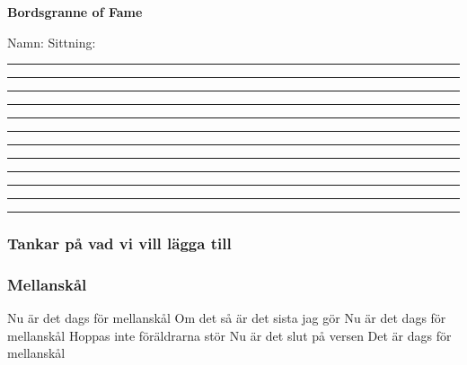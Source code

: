 \noBackground

\newpage
\resetBackground

\thispagestyle{plainnohead}

\vspace*{-13mm} %
\enlargethispage{15mm} %

\begin{center}
    \normalfont\normalsize\bfseries Bordsgranne of Fame
\end{center}

Namn: \hspace{2.5cm} Sittning: 

\vspace*{0.3cm}
\rule{\textwidth}{0.0mm}
\vspace*{0.65cm}
\rule{\textwidth}{0.4mm}
\vspace*{0.65cm}
\rule{\textwidth}{0.4mm}
\vspace*{0.65cm}
\rule{\textwidth}{0.4mm}
\vspace*{0.65cm}
\rule{\textwidth}{0.4mm}
\vspace*{0.65cm}
\rule{\textwidth}{0.4mm}
\vspace*{0.65cm}
\rule{\textwidth}{0.4mm}
\vspace*{0.65cm}
\rule{\textwidth}{0.4mm}
\vspace*{0.65cm}
\rule{\textwidth}{0.4mm}
\vspace*{0.65cm}
\rule{\textwidth}{0.4mm}
\vspace*{0.65cm}
\rule{\textwidth}{0.4mm}
\vspace*{0.65cm}
\rule{\textwidth}{0.4mm}

\noBackground

\newpage
\resetBackground




\subsubsection*{Tankar på vad vi vill lägga till}

\subsubsection*{Mellanskål}

Nu är det dags för mellanskål
Om det så är det sista jag gör
Nu är det dags för mellanskål
Hoppas inte föräldrarna stör
Nu är det slut på versen 
Det är dags för mellanskål

